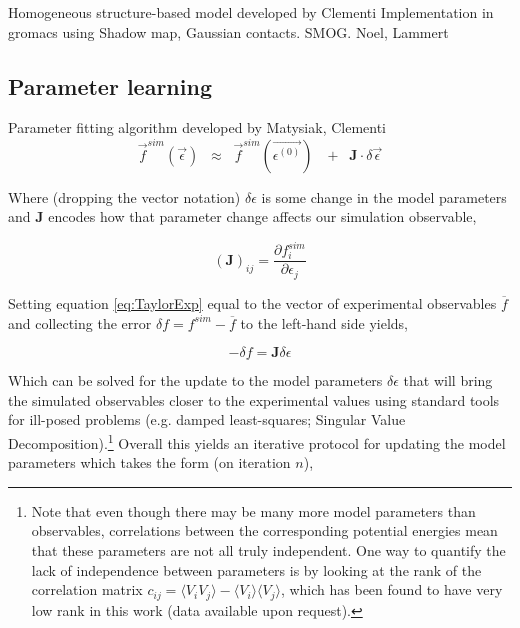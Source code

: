 \documentclass[preprint]{elsarticle}
\begin{document}
Homogeneous structure-based model developed by Clementi 
Implementation in gromacs using Shadow map, Gaussian contacts. SMOG. Noel, Lammert


\subsection{Parameter learning}



Parameter fitting algorithm developed by Matysiak, Clementi
\begin{equation}
\label{eq:TaylorExp}
    \vec{f}^{sim}(\vec\epsilon) \;\;\approx \;\;\vec{f}^{sim}(\vec{\epsilon^{(0)}})\
                                \;\;+\;\;\bm{J}\cdot\delta\vec\epsilon 
\end{equation}

    Where (dropping the vector notation) $\delta\epsilon$ is some change in the
model parameters and $\bm{J}$ encodes how that parameter change affects our
simulation observable,

\begin{equation}
    \left(\bm{J}\right)_{ij} = \frac{\partial f^{sim}_i}{\partial\epsilon_j} 
\end{equation}

    Setting equation \ref{eq:TaylorExp} equal to the vector of experimental
observables $\overline{f}$ and collecting the error $\delta f = f^{sim} -
\overline{f}$ to the left-hand side yields,

\begin{equation}
\label{eq:dfJdeps}
    -\delta f = \bm{J}\delta\epsilon
\end{equation}

    Which can be solved for the update to the model parameters $\delta\epsilon$
that will bring the simulated observables closer to the experimental values
using standard tools for ill-posed problems (e.g. damped
least-squares\cite{Marquardt1963}; Singular Value Decomposition).\footnote{Note
that even though there may be many more model parameters than observables,
correlations between the corresponding potential energies mean that these
parameters are not all truly independent. One way to quantify the lack of
independence between parameters is by looking at the rank of the correlation
matrix $c_{ij} = \langle V_iV_j\rangle - \langle V_i\rangle \langle V_j
\rangle$, which has been found to have very low rank in this work (data
available upon request).} Overall this yields an iterative protocol for
updating the model parameters which takes the form (on iteration $n$),
\end{document}

